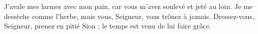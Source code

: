 J’avale mes larmes avec mon pain, car vous m’avez soulevé et jeté au loin. Je me dessèche comme l’herbe, mais vous, Seigneur, vous trônez à jamais. Dressez-vous, Seigneur, prenez en pitié Sion ; le temps est venu de lui faire grâce.